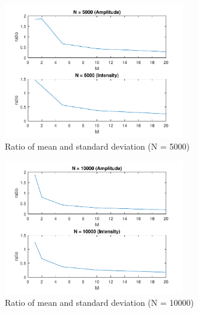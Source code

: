 \documentclass{article}
\begin{document}
\begin{figure}[H]
	\centering
	\includegraphics[width = 0.7\textwidth]{src/2pi/ratio_5000.pdf}
	\caption{Ratio of mean and standard deviation (N = 5000)}
	\label{fig:ratio-5000}
\end{figure}
\begin{figure}[H]
	\centering
	\includegraphics[width = 0.7\textwidth]{src/2pi/ratio_10000.pdf}
	\caption{Ratio of mean and standard deviation (N = 10000)}
	\label{fig:ratio-10000}
\end{figure}
\end{document}
